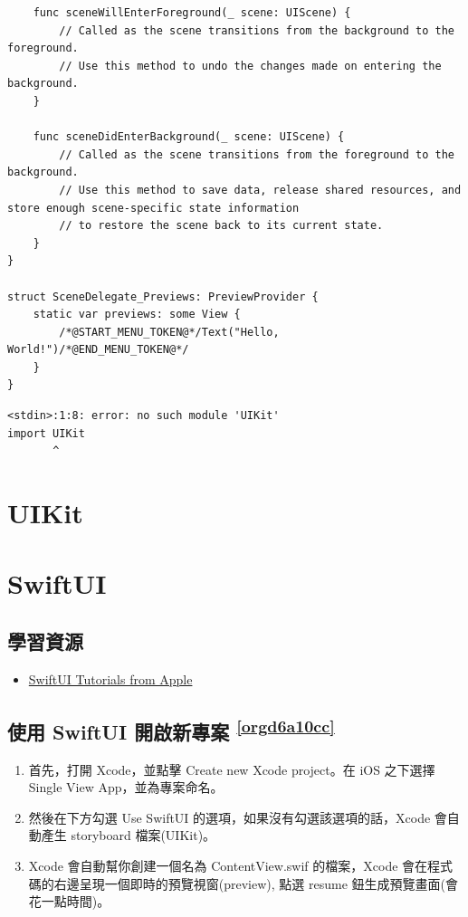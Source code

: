 \documentclass[a4paper,12pt]{article}
\begin{document}
\begin{lstlisting}
    func sceneWillEnterForeground(_ scene: UIScene) {
        // Called as the scene transitions from the background to the foreground.
        // Use this method to undo the changes made on entering the background.
    }

    func sceneDidEnterBackground(_ scene: UIScene) {
        // Called as the scene transitions from the foreground to the background.
        // Use this method to save data, release shared resources, and store enough scene-specific state information
        // to restore the scene back to its current state.
    }
}

struct SceneDelegate_Previews: PreviewProvider {
    static var previews: some View {
        /*@START_MENU_TOKEN@*/Text("Hello, World!")/*@END_MENU_TOKEN@*/
    }
}
\end{lstlisting}

\begin{verbatim}
<stdin>:1:8: error: no such module 'UIKit'
import UIKit
       ^
\end{verbatim}

\section{UIKit}
\label{sec:org4ce8ea3}

\section{SwiftUI}
\label{sec:org01f2977}
\subsection{學習資源}
\label{sec:org2b9972e}
\begin{itemize}
\item \href{https://developer.apple.com/tutorials/swiftui/creating-and-combining-views}{SwiftUI Tutorials from Apple}\\
\end{itemize}

\subsection{使用 SwiftUI 開啟新專案 \textsuperscript{\ref{orgd6a10cc}}}
\label{sec:org68c3f29}
\begin{enumerate}
\item 首先，打開 Xcode，並點擊 Create new Xcode project。在 iOS 之下選擇 Single View App，並為專案命名。\\
\item 然後在下方勾選 Use SwiftUI 的選項，如果沒有勾選該選項的話，Xcode 會自動產生 storyboard 檔案(UIKit)。\\
\item Xcode 會自動幫你創建一個名為 ContentView.swif 的檔案，Xcode 會在程式碼的右邊呈現一個即時的預覽視窗(preview), 點選 resume 鈕生成預覽畫面(會花一點時間)。\\
\end{enumerate}
\end{document}

